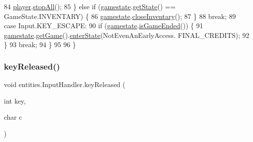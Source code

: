 \begin{DoxyCode}
84                     \mbox{\hyperlink{classentities_1_1_input_handler_a65bea2d31684e8d91db9ffef9268f9e9}{player}}.\mbox{\hyperlink{classentities_1_1_player_adc49b9d4f92d988724264ff27f2225d8}{stopAll}}();
85                 \} \textcolor{keywordflow}{else} \textcolor{keywordflow}{if} (\mbox{\hyperlink{classentities_1_1_input_handler_a9f4e32826b3780c5310530d3db807df1}{gamestate}}.\mbox{\hyperlink{classstates_1_1_game_state_ab3aace79bbd3da8c4e838ac872ffb2a2}{getState}}() == GameState.INVENTARY) \{
86                     \mbox{\hyperlink{classentities_1_1_input_handler_a9f4e32826b3780c5310530d3db807df1}{gamestate}}.\mbox{\hyperlink{classstates_1_1_game_state_a7b673342f6dc74ba4c452ff346782d04}{closeInventary}}();
87                 \}
88                 \textcolor{keywordflow}{break};
89             \textcolor{keywordflow}{case} Input.KEY\_ESCAPE:
90                 \textcolor{keywordflow}{if} (\mbox{\hyperlink{classentities_1_1_input_handler_a9f4e32826b3780c5310530d3db807df1}{gamestate}}.\mbox{\hyperlink{classstates_1_1_game_state_a30ae5d760e45322b8e77c5959dc992f5}{isGameEnded}}()) \{
91                     \mbox{\hyperlink{classentities_1_1_input_handler_a9f4e32826b3780c5310530d3db807df1}{gamestate}}.\mbox{\hyperlink{classstates_1_1_game_state_a08a716dc1292aef4744b305312e598f1}{getGame}}().\mbox{\hyperlink{classorg_1_1newdawn_1_1slick_1_1state_1_1_state_based_game_a30b279d5177837e9d4eee745c79cc069}{enterState}}(NotEvenAnEarlyAccess.
      FINAL\_CREDITS);
92                 \}
93                 \textcolor{keywordflow}{break};
94         \}
95 
96     \}
\end{DoxyCode}
\mbox{\label{classentities_1_1_input_handler_a2716ee43b20accd25e37268ac67c5488}} 
\subsubsection{\texorpdfstring{key\+Released()}{keyReleased()}}
{\footnotesize\ttfamily void entities.\+Input\+Handler.\+key\+Released (\begin{DoxyParamCaption}\item[{int}]{key,  }\item[{char}]{c }\end{DoxyParamCaption})\hspace{0.3cm}{\ttfamily [inline]}}

